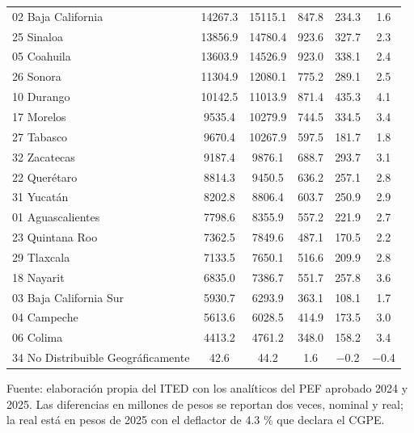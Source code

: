 \begin{longtable}{L{4.2cm}SSSSS}
{02 Baja California} & \num{14267.3} & \num{15115.1} & \num{847.8} & \num{234.3} & \num{1.6} \\
{25 Sinaloa} & \num{13856.9} & \num{14780.4} & \num{923.6} & \num{327.7} & \num{2.3} \\
{05 Coahuila} & \num{13603.9} & \num{14526.9} & \num{923.0} & \num{338.1} & \num{2.4} \\
{26 Sonora} & \num{11304.9} & \num{12080.1} & \num{775.2} & \num{289.1} & \num{2.5} \\
{10 Durango} & \num{10142.5} & \num{11013.9} & \num{871.4} & \num{435.3} & \num{4.1} \\
{17 Morelos} & \num{9535.4} & \num{10279.9} & \num{744.5} & \num{334.5} & \num{3.4} \\
{27 Tabasco} & \num{9670.4} & \num{10267.9} & \num{597.5} & \num{181.7} & \num{1.8} \\
{32 Zacatecas} & \num{9187.4} & \num{9876.1} & \num{688.7} & \num{293.7} & \num{3.1} \\
{22 Querétaro} & \num{8814.3} & \num{9450.5} & \num{636.2} & \num{257.1} & \num{2.8} \\
{31 Yucatán} & \num{8202.8} & \num{8806.4} & \num{603.7} & \num{250.9} & \num{2.9} \\
{01 Aguascalientes} & \num{7798.6} & \num{8355.9} & \num{557.2} & \num{221.9} & \num{2.7} \\
{23 Quintana Roo} & \num{7362.5} & \num{7849.6} & \num{487.1} & \num{170.5} & \num{2.2} \\
{29 Tlaxcala} & \num{7133.5} & \num{7650.1} & \num{516.6} & \num{209.9} & \num{2.8} \\
{18 Nayarit} & \num{6835.0} & \num{7386.7} & \num{551.7} & \num{257.8} & \num{3.6} \\
{03 Baja California Sur} & \num{5930.7} & \num{6293.9} & \num{363.1} & \num{108.1} & \num{1.7} \\
{04 Campeche} & \num{5613.6} & \num{6028.5} & \num{414.9} & \num{173.5} & \num{3.0} \\
{06 Colima} & \num{4413.2} & \num{4761.2} & \num{348.0} & \num{158.2} & \num{3.4} \\
{34 No Distribuible Geográficamente} & \num{42.6} & \num{44.2} & \num{1.6} & \num{-0.2} & \num{-0.4} \\
\end{longtable}
\par\vspace{2pt}\footnotesize Fuente: elaboración propia del ITED con los analíticos del PEF aprobado 2024 y 2025. Las diferencias en millones de pesos se reportan dos veces, nominal y real; la real está en pesos de 2025 con el deflactor de 4.3 \% que declara el CGPE.
\normalsize
